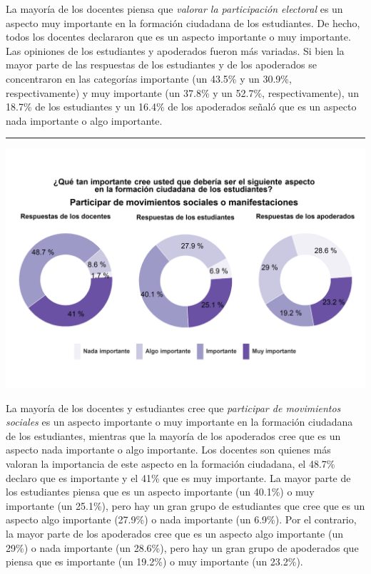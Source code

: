 \documentclass[
  14pt,
]{book}
\let\origfigure\figure
\let\endorigfigure\endfigure
\renewenvironment{figure}[1][2] {
  \expandafter\origfigure\expandafter[H]
} {
  \endorigfigure
}
\begin{document}
La mayoría de los docentes piensa que \emph{valorar la participación electoral} es un aspecto muy importante en la formación ciudadana de los estudiantes. De hecho, todos los docentes declararon que es un aspecto importante o muy importante. Las opiniones de los estudiantes y apoderados fueron más variadas. Si bien la mayor parte de las respuestas de los estudiantes y de los apoderados se concentraron en las categorías importante (un 43.5\% y un 30.9\%, respectivamente) y muy importante (un 37.8\% y un 52.7\%, respectivamente), un 18.7\% de los estudiantes y un 16.4\% de los apoderados señaló que es un aspecto nada importante o algo importante.

\begin{center}\rule{0.5\linewidth}{0.5pt}\end{center}

\begin{figure}[!ht]

{\centering \includegraphics[width=0.8\linewidth,]{images/graph_for_ciud4} 

}

\caption{Relevancia de los movimientos sociales}\label{fig:unnamed-chunk-28}
\end{figure}

La mayoría de los docentes y estudiantes cree que \emph{participar de movimientos sociales} es un aspecto importante o muy importante en la formación ciudadana de los estudiantes, mientras que la mayoría de los apoderados cree que es un aspecto nada importante o algo importante. Los docentes son quienes más valoran la importancia de este aspecto en la formación ciudadana, el 48.7\% declaro que es importante y el 41\% que es muy importante. La mayor parte de los estudiantes piensa que es un aspecto importante (un 40.1\%) o muy importante (un 25.1\%), pero hay un gran grupo de estudiantes que cree que es un aspecto algo importante (27.9\%) o nada importante (un 6.9\%). Por el contrario, la mayor parte de los apoderados cree que es un aspecto algo importante (un 29\%) o nada importante (un 28.6\%), pero hay un gran grupo de apoderados que piensa que es importante (un 19.2\%) o muy importante (un 23.2\%).
\end{document}
